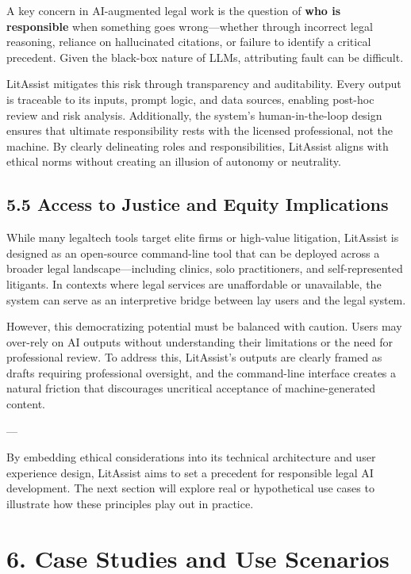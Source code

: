 \documentclass[12pt,a4paper]{article}
\begin{document}
A key concern in AI-augmented legal work is the question of \textbf{who is responsible} when something goes wrong—whether through incorrect legal reasoning, reliance on hallucinated citations, or failure to identify a critical precedent. Given the black-box nature of LLMs, attributing fault can be difficult.

LitAssist mitigates this risk through transparency and auditability. Every output is traceable to its inputs, prompt logic, and data sources, enabling post-hoc review and risk analysis. Additionally, the system's human-in-the-loop design ensures that ultimate responsibility rests with the licensed professional, not the machine. By clearly delineating roles and responsibilities, LitAssist aligns with ethical norms without creating an illusion of autonomy or neutrality.

\subsection*{5.5 Access to Justice and Equity Implications}

While many legaltech tools target elite firms or high-value litigation, LitAssist is designed as an open-source command-line tool that can be deployed across a broader legal landscape—including clinics, solo practitioners, and self-represented litigants. In contexts where legal services are unaffordable or unavailable, the system can serve as an interpretive bridge between lay users and the legal system.

However, this democratizing potential must be balanced with caution. Users may over-rely on AI outputs without understanding their limitations or the need for professional review. To address this, LitAssist's outputs are clearly framed as drafts requiring professional oversight, and the command-line interface creates a natural friction that discourages uncritical acceptance of machine-generated content.

---

By embedding ethical considerations into its technical architecture and user experience design, LitAssist aims to set a precedent for responsible legal AI development. The next section will explore real or hypothetical use cases to illustrate how these principles play out in practice.

\section*{6. Case Studies and Use Scenarios}
\end{document}
